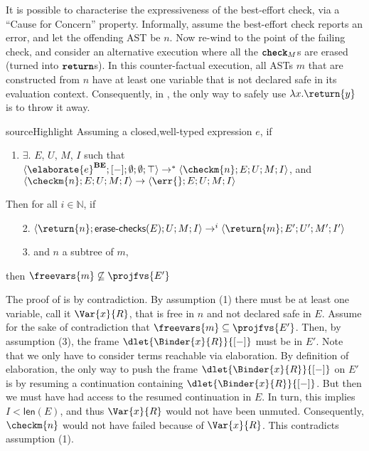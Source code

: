 It is possible to characterise the expressiveness of the best-effort check, via a ``Cause for Concern'' property. Informally, assume the best-effort check reports an error, and let the offending AST be $n$. Now re-wind to the point of the failing check, and consider an alternative execution where all the $\textbf{\texttt{check}}_M$s are erased (turned into $\textbf{\texttt{return}}$s). In this counter-factual execution, all ASTs $m$ that are constructed from $n$ have at least one variable that is not declared safe in its evaluation context. Consequently, in , the only way to safely use $\lambda x.\return{y}$ is to throw it away. 

\begin{theorem}{sourceHighlight}\label{thm:best-effort-cause-for-concern} Assuming a closed,well-typed \sourceLang{} expression $e$, if
  \begin{enumerate}
    \item $\exists.$ $E$, $U$, $M$, $I$ such that $\langle \elaborate{e}^{\textbf{BE}}; [-];\emptyset; \emptyset; \top \rangle \to^{*}\langle \checkm{n}; E; U; M; I \rangle$,
    and \\$\langle \checkm{n}; E; U; M; I \rangle \to \langle \err{}; E; U; M; I \rangle$
  \end{enumerate}
Then for all $i \in \mathbb{N}$, if 
\begin{enumerate}
  \item[2.] $\langle \return{n}; \textsf{erase-checks}(E); U; M; I \rangle \to^{i} \langle \return{m}; E'; U'; M'; I' \rangle$
  \item[3.] and $n$ a subtree of $m$,  
\end{enumerate}
then $\freevars{m} \not\subseteq \projfvs{E'}$  
\end{theorem}

The proof of  is by contradiction. By assumption (1) there must be at least one variable, call it $\Var{x}{R}$, that is free in $n$ and not declared safe in $E$. Assume for the sake of contradiction that $\freevars{m} \subseteq \projfvs{E'}$. Then, by assumption (3), the frame $\dlet{\Binder{x}{R}}{[-]}$ must be in $E'$. Note that we only have to consider terms reachable via elaboration. By definition of elaboration, the only way to push the frame $\dlet{\Binder{x}{R}}{[-]}$ on $E'$ is by resuming a continuation containing $\dlet{\Binder{x}{R}}{[-]}$. But then we must have had access to the resumed continuation in $E$. In turn, this implies $I < \textsf{len}(E)$, and thus $\Var{x}{R}$ would not have been unmuted. Consequently, $\checkm{n}$ would not have failed because of $\Var{x}{R}$. This contradicts assumption (1). 

